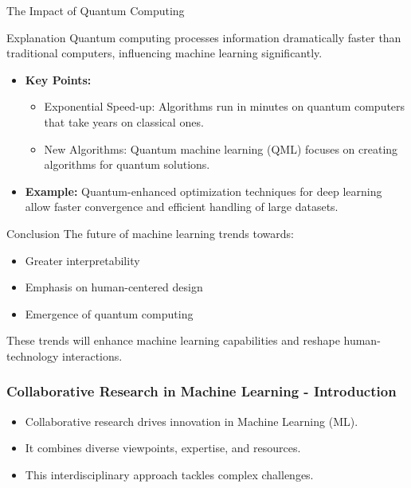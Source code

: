 \documentclass[aspectratio=169]{beamer}
\begin{document}
\begin{frame}[fragile]{The Impact of Quantum Computing}
    \begin{block}{Explanation}
        Quantum computing processes information dramatically faster than traditional computers, influencing machine learning significantly.
    \end{block}

    \begin{itemize}
        \item \textbf{Key Points:}
        \begin{itemize}
            \item Exponential Speed-up: Algorithms run in minutes on quantum computers that take years on classical ones.
            \item New Algorithms: Quantum machine learning (QML) focuses on creating algorithms for quantum solutions.
        \end{itemize}
        \item \textbf{Example:} 
            Quantum-enhanced optimization techniques for deep learning allow faster convergence and efficient handling of large datasets.
    \end{itemize}
\end{frame}

\begin{frame}[fragile]{Conclusion}
    The future of machine learning trends towards:
    \begin{itemize}
        \item Greater interpretability
        \item Emphasis on human-centered design
        \item Emergence of quantum computing
    \end{itemize}
    These trends will enhance machine learning capabilities and reshape human-technology interactions.
\end{frame}

\begin{frame}[fragile]
    \frametitle{Collaborative Research in Machine Learning - Introduction}
    \begin{itemize}
        \item Collaborative research drives innovation in Machine Learning (ML).
        \item It combines diverse viewpoints, expertise, and resources.
        \item This interdisciplinary approach tackles complex challenges.
    \end{itemize}
\end{frame}
\end{document}
